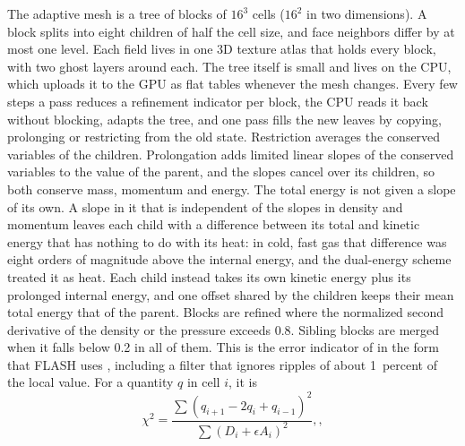 \documentclass[twocolumn]{aastex701}
\begin{document}
The adaptive mesh is a tree of blocks of $16^3$ cells ($16^2$ in two dimensions). A block splits into eight children of half the cell size, and face neighbors differ by at most one level. Each field lives in one 3D texture atlas that holds every block, with two ghost layers around each. The tree itself is small and lives on the CPU, which uploads it to the GPU as flat tables whenever the mesh changes. Every few steps a pass reduces a refinement indicator per block, the CPU reads it back without blocking, adapts the tree, and one pass fills the new leaves by copying, prolonging or restricting from the old state. Restriction averages the conserved variables of the children. Prolongation adds limited linear slopes of the conserved variables to the value of the parent, and the slopes cancel over its children, so both conserve mass, momentum and energy. The total energy is not given a slope of its own. A slope in it that is independent of the slopes in density and momentum leaves each child with a difference between its total and kinetic energy that has nothing to do with its heat: in cold, fast gas that difference was eight orders of magnitude above the internal energy, and the dual-energy scheme treated it as heat. Each child instead takes its own kinetic energy plus its prolonged internal energy, and one offset shared by the children keeps their mean total energy that of the parent. Blocks are refined where the normalized second derivative of the density or the pressure exceeds 0.8. Sibling blocks are merged when it falls below 0.2 in all of them. This is the error indicator of \citet{Lohner1987} in the form that FLASH uses \citep{Fryxell2000}, including a filter that ignores ripples of about 1~percent of the local value. For a quantity $q$ in cell $i$, it is
\begin{equation*}
\chi^2 = \frac{\sum (q_{i+1} - 2q_i + q_{i-1})^2}{\sum (D_i + \epsilon A_i)^2},,
\end{equation*}
\end{document}
